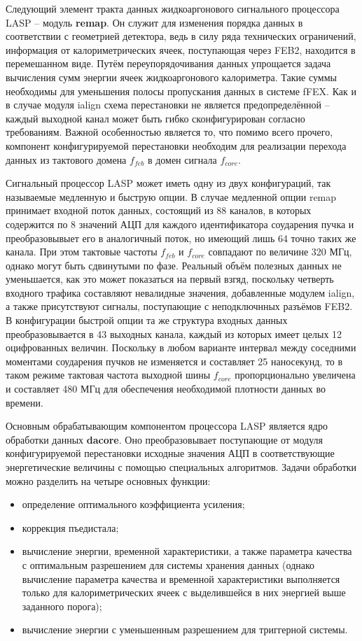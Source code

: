 Следующий элемент тракта данных жидкоаргонового сигнального процессора LASP -- модуль \textbf{remap}. Он служит для изменения порядка данных в соответствии с геометрией детектора, ведь в силу ряда технических ограничений, информация от калориметрических ячеек, поступающая через FEB2, находится в перемешанном виде. Путём переупорядочивания данных упрощается задача вычисления сумм энергии ячеек жидкоаргонового калориметра. Такие суммы необходимы для уменьшения полосы пропускания данных в системе fFEX. Как и в случае модуля ialign схема перестановки не является предопределённой -- каждый выходной канал может быть гибко сконфигурирован согласно требованиям. Важной особенностью является то, что помимо всего прочего, компонент конфигурируемой перестановки необходим для реализации перехода данных из тактового домена $f_{feb}$ в домен сигнала $f_{core}$.\par
Сигнальный процессор LASP может иметь одну из двух конфигураций, так называемые медленную и быструю опции. В случае медленной опции remap принимает входной поток данных, состоящий из 88 каналов, в которых содержится по 8 значений АЦП для каждого идентификатора соударения пучка и преобразовывыет его в аналогичный поток, но имеющий лишь 64 точно таких же канала. При этом тактовые частоты $f_{feb}$ и $f_{core}$ совпадают по величине 320 МГц, однако могут быть сдвинутыми по фазе. Реальный объём полезных данных не уменьшается, как это может показаться на первый взгяд, поскольку четверть входного трафика составляют невалидные значения, добавленные модулем ialign, а также присутствуют сигналы, поступающие с неподключнных разъёмов FEB2. В конфигурации быстрой опции та же структура входных данных преобразовывается в 43 выходных канала, каждый из которых имеет целых 12 оцифрованных величин. Поскольку в любом варианте интервал между соседними моментами соударения пучков не изменяется и составляет 25 наносекунд, то в таком режиме тактовая частота выходной шины $f_{core}$ пропорционально увеличена и составляет 480 МГц для обеспечения необходимой плотности данных во времени.\par
Основным обрабатывающим компонентом процессора LASP является ядро обработки данных \textbf{dacore}. Оно преобразовывает поступающие от модуля конфигурируемой перестановки исходные значения АЦП в соответствующие энергетические величины с помощью специальных алгоритмов. Задачи обработки можно разделить на четыре основных функции:\par
\begin{itemize}
    \item определение оптимального коэффициента усиления;
    \item коррекция пъедистала;
    \item вычисление энергии, временной характеристики, а также параметра качества с оптимальным разрешением для системы хранения данных (однако вычисление параметра качества и временной характеристики выполняется только для калориметрических ячеек с выделившейся в них энергией выше заданного порога);
    \item вычисление энергии с уменьшенным разрешением для триггерной системы.
\end{itemize}\par
